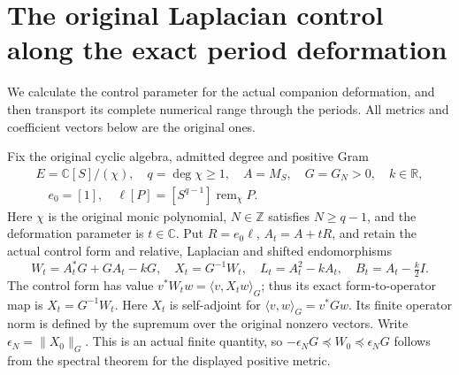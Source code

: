 \documentclass{article}
\begin{document}
\maketitle
\section{The original Laplacian control along the exact period deformation}
\label{sec:period-laplacian-control-bridge}

We calculate the control parameter for the actual companion deformation,
and then transport its complete numerical range through the periods.
All metrics and coefficient vectors below are the original ones.

Fix the original cyclic algebra, admitted degree and positive Gram
\[
 \begin{gathered}
 E=\mathbb C[S]/(\chi),\quad q=\deg\chi\ge1,\quad
 A=M_S,\quad G=G_N>0,\quad k\in\mathbb R,
 \\
 \quad e_0=[1],\quad
 \ell[P]=[S^{q-1}]\operatorname{rem}_{\chi}P.
 \end{gathered}
 \tag{LC1}
\]
Here $\chi$ is the original monic polynomial, $N\in\mathbb Z$ satisfies
$N\ge q-1$, and the deformation parameter is $t\in\mathbb C$.
Put \(R=e_0\ell\), \(A_t=A+tR\), and retain the actual control form
and relative, Laplacian and shifted endomorphisms
\[
 W_t=A_t^*G+GA_t-kG,\quad X_t=G^{-1}W_t,\quad
 L_t=A_t^2-kA_t,\quad B_t=A_t-\tfrac k2I.
 \tag{LC2}
\]
The control form has value $v^*W_tw=\langle v,X_tw\rangle_G$;
thus its exact form-to-operator map is $X_t=G^{-1}W_t$.
Here \(X_t\) is self-adjoint for
\(\langle v,w\rangle_G=v^*Gw\). Its finite operator norm is defined
by the supremum over the original nonzero vectors. Write
\(\epsilon_N=\|X_0\|_G\). This is an actual finite quantity, so
\(-\epsilon_NG\preceq W_0\preceq\epsilon_NG\) follows from the
spectral theorem for the displayed positive metric.
\end{document}
